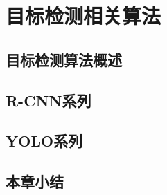 \section{目标检测相关算法}
\setcounter{figure}{0}

\subsection{目标检测算法概述}
\subsection{R-CNN系列}
\subsection{YOLO系列}
\subsection{本章小结}







